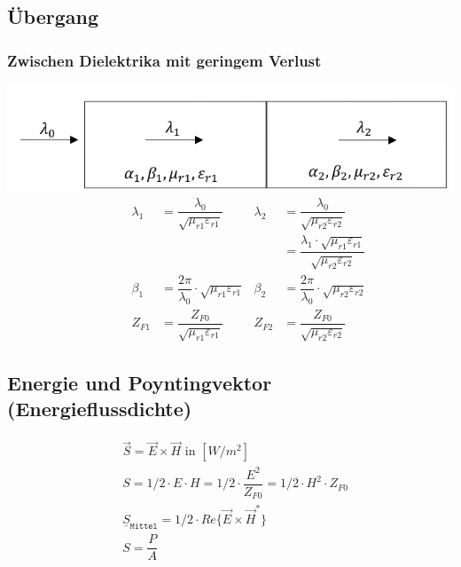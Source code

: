 \subsection{Übergang}
\subsubsection{Zwischen Dielektrika mit geringem Verlust}

\includegraphics[width=\columnwidth]{Figures/UebergangzweiDielektrika.png}
\begin{align*}
    \quad \qquad \lambda_1 & = \dfrac{\lambda_0}{\sqrt{\mu_{r1}\varepsilon_{r1}}}          & \lambda_2 & = \dfrac{\lambda_0}{\sqrt{\mu_{r2}\varepsilon_{r2}}}                                     \\
    \quad \qquad           &                                                               &           & = \dfrac{\lambda_1\cdot\sqrt{\mu_{r1}\varepsilon_{r1}}}{\sqrt{\mu_{r2}\varepsilon_{r2}}} \\
    \quad \qquad \beta_1   & = \dfrac{2\pi}{\lambda_0}\cdot\sqrt{\mu_{r1}\varepsilon_{r1}} & \beta_2   & = \dfrac{2\pi}{\lambda_0}\cdot\sqrt{\mu_{r2}\varepsilon_{r2}}                            \\
    \quad \qquad Z_{F1}    & = \dfrac{Z_{F0}}{\sqrt{\mu_{r1}\varepsilon_{r1}}}             & Z_{F2}    & = \dfrac{Z_{F0}}{\sqrt{\mu_{r2}\varepsilon_{r2}}}
\end{align*}

\subsection{Energie und Poyntingvektor (Energieflussdichte)}
\begin{align*}
     & \vec{S} = \vec{E}\times\vec{H} \text{ in } [W/m^2]                                   \\
     & S = 1/2 \cdot E \cdot H = 1/2 \cdot \dfrac{E^2}{Z_{F0}} = 1/2 \cdot H^2 \cdot Z_{F0} \\
     & \underline{S}_{\texttt{Mittel}} = 1/2 \cdot Re\{\vec{E}\times\vec{H}^*\}             \\
     & S = \dfrac{P}{A}                                                                     \\
\end{align*}

